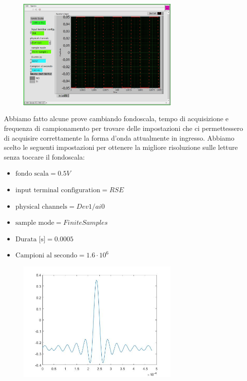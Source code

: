 \begin{figure}[H]
\caption{}
    \includegraphics[width=8cm]{settimana_1/immagini/fondoscala.jpg}
    \centering
\end{figure}


Abbiamo fatto alcune prove cambiando fondoscala, tempo di acquisizione e frequenza di campionamento per trovare delle impostazioni che ci permettessero di acquisire correttamente la forma d'onda attualmente in ingresso. Abbiamo scelto le seguenti impostazioni per ottenere la migliore risoluzione sulle letture senza toccare il fondoscala:
\begin{itemize}
    \item $\text{fondo scala} = 0.5 V$
    \item $\text{input terminal configuration} = RSE$
    \item $\text{physical channels} = Dev1/ai0$
    \item $\text{sample mode} = Finite Samples$
    \item $\text{Durata [s]} = 0.0005$
    \item $\text{Campioni al secondo} = 1.6 \cdot 10^6$
\end{itemize}

\begin{figure}[H]
\caption{}
    \includegraphics[width=8cm]{settimana_1/immagini/prima_matlab.jpg}
    \centering
\end{figure}

